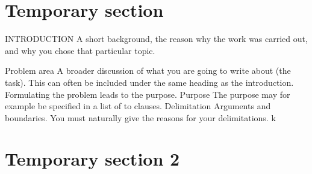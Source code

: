 \section{Temporary section}
INTRODUCTION A short background, the reason why the work was carried out, and why
you chose that particular topic.

 Problem area A broader discussion of what you are going to write about (the task). This
can often be included under the same heading as the introduction. Formulating the problem
leads to the purpose.
 Purpose  The purpose may for example be specified in a list of to clauses.
 Delimitation  Arguments and boundaries. You must naturally give the reasons for your
delimitations.
k
\section{Temporary section 2}
